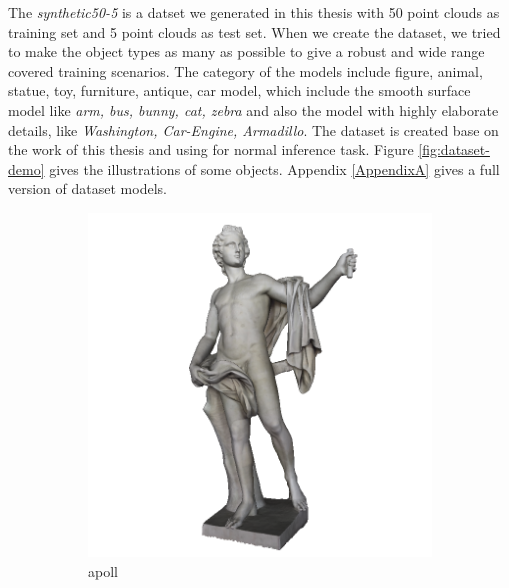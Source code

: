 \documentclass[border=15pt, multi, tikz]{article}
\begin{document}
The \textit{synthetic50-5} is a datset we generated in this thesis with 50 point clouds as training set and 5 point clouds as test set. When we create the dataset, we tried to make the object types as many as possible to give a robust and wide range covered training scenarios. The category of the models include figure, animal, statue, toy, furniture, antique, car model, which include the smooth surface model like \textit{arm, bus, bunny, cat, zebra} and also the model with highly elaborate details, like \textit{Washington, Car-Engine, Armadillo}. 
The dataset is created base on the work of this thesis and using for normal inference task. Figure \ref{fig:dataset-demo} gives the illustrations of some objects. Appendix \ref{AppendixA} gives a full version of dataset models.

\begin{figure}[!h]
	\centering
	\begin{subfigure}[b]{0.24\linewidth}
		\includegraphics[width=\linewidth]{./Figures/train-dataset/00.apoll.png}
		\caption{apoll}
	\end{subfigure}
	\begin{subfigure}[b]{0.24\linewidth}

\end{subfigure}
\end{figure}
\end{document}

